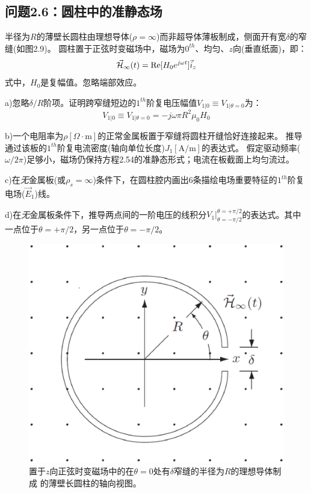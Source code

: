 \subsection{问题2.6：圆柱中的准静态场}
半径为$R$的薄壁长圆柱由理想导体($\rho=\infty$)而非超导体薄板制成，侧面开有宽$\delta$的窄缝(如图2.9)。
圆柱置于正弦时变磁场中，磁场为$0^{th}$、均匀、$z$向(垂直纸面)，即：
\begin{equation}
\vec{\CMcal{H}}_\infty(t)=\mathrm{Re}[H_0 e^{j\omega t}] \vec{i}_z
\end{equation}
式中，$H_0$是复幅值。忽略端部效应。

a)忽略$\delta/R$阶项。证明跨窄缝短边的$1^{th}$阶复电压幅值$V_{1|0}\equiv V_{1|\theta=0}$为：
\begin{equation}
V_{1|0}\equiv V_{1|\theta=0}=-j\omega \pi R^2 \mu_0 H_0
\end{equation}

b)一个电阻率为$\rho[\Omega\cdot\mathrm{m}]$的正常金属板置于窄缝将圆柱开缝恰好连接起来。
推导通过该板的$1^{th}$阶复电流密度(轴向单位长度)$J_1 [\mathrm{A/m}]$的表达式。
假定驱动频率($\omega/2\pi$)足够小，磁场仍保持方程2.54的准静态形式；电流在板截面上均匀流过。

c)在\textit{无}金属板(或$\rho_s=\infty$)条件下，在圆柱腔内画出6条描绘电场重要特征的$1^{th}$阶复电场($\vec{E}_1$)线。

d)在\textit{无}金属板条件下，推导两点间的一阶电压的线积分$V_1 |_{\theta=-\pi/2}^{\theta=+\pi/2}$的表达式。其中一点位于$\theta=+\pi/2$，另一点位于$\theta=-\pi/2$。

\begin{figure}[htbp]
  \centering
 \includegraphics[scale=0.4]{chpt2/figs/fig2.9.eps}
  \caption{置于$z$向正弦时变磁场中的在$\theta=0$处有$\delta$窄缝的半径为$R$的理想导体制成
  的薄壁长圆柱的轴向视图。}
\end{figure}

